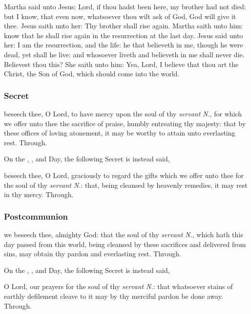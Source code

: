  Martha said unto Jesus: Lord, if thou hadst been here, my brother had not died: but I know, that even now, whatsoever thou wilt ask of God, God will give it thee. Jesus saith unto her: Thy brother shall rise again. Martha saith unto him: know that he shall rise again in the resurrection at the last day. Jesus said unto her: I am the resurrection, and the life: he that believeth in me, though he were dead, yet shall he live: and whosoever liveth and believeth in me shall never die. Believest thou this? She saith unto him: Yea, Lord, I believe that thou art the Christ, the Son of God, which should come into the world.

\subsubsection{Secret}
 beseech thee, O Lord, to have mercy upon the soul of thy \textit{servant} \textit{N.}, for which we offer unto thee the sacrifice of praise, humbly entreating thy majesty: that by these offices of loving atonement, it may be worthy to attain unto everlasting rest. Through.

\begin{rubric}
    On the , , and  Day, the following Secret is instead said,
\end{rubric}
 beseech thee, O Lord, graciously to regard the gifts which we offer unto thee for the soul of thy \textit{servant} \textit{N.}: that, being cleansed by heavenly remedies, it may rest in thy mercy. Through.

\subsubsection{Postcommunion}
 we beseech thee, almighty God: that the soul of thy \textit{servant} \textit{N.}, which hath this day passed from this world, being cleansed by these sacrifices and delivered from sins, may obtain thy pardon and everlasting rest. Through.

\begin{rubric}
    On the , , and  Day, the following Secret is instead said,
\end{rubric}
 O Lord, our prayers for the soul of thy \textit{servant} \textit{N.}: that whatsoever stains of earthly defilement cleave to it may by thy merciful pardon be done away. Through.

